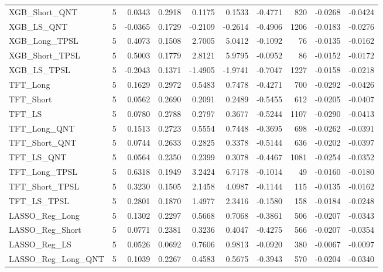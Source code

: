\begin{tabular}{llrrrrrrrr}
\cline{1-10}
XGB\_Short\_QNT & 5 & 0.0343 & 0.2918 & 0.1175 & 0.1533 & -0.4771 & 820 & -0.0268 & -0.0424 \\
\cline{1-10}
XGB\_LS\_QNT & 5 & -0.0365 & 0.1729 & -0.2109 & -0.2614 & -0.4906 & 1206 & -0.0183 & -0.0276 \\
\cline{1-10}
XGB\_Long\_TPSL & 5 & 0.4073 & 0.1508 & 2.7005 & 5.0412 & -0.1092 & 76 & -0.0135 & -0.0162 \\
\cline{1-10}
XGB\_Short\_TPSL & 5 & 0.5003 & 0.1779 & 2.8121 & 5.9795 & -0.0952 & 86 & -0.0152 & -0.0172 \\
\cline{1-10}
XGB\_LS\_TPSL & 5 & -0.2043 & 0.1371 & -1.4905 & -1.9741 & -0.7047 & 1227 & -0.0158 & -0.0218 \\
\cline{1-10}
TFT\_Long & 5 & 0.1629 & 0.2972 & 0.5483 & 0.7478 & -0.4271 & 700 & -0.0292 & -0.0426 \\
\cline{1-10}
TFT\_Short & 5 & 0.0562 & 0.2690 & 0.2091 & 0.2489 & -0.5455 & 612 & -0.0205 & -0.0407 \\
\cline{1-10}
TFT\_LS & 5 & 0.0780 & 0.2788 & 0.2797 & 0.3677 & -0.5244 & 1107 & -0.0290 & -0.0413 \\
\cline{1-10}
TFT\_Long\_QNT & 5 & 0.1513 & 0.2723 & 0.5554 & 0.7448 & -0.3695 & 698 & -0.0262 & -0.0391 \\
\cline{1-10}
TFT\_Short\_QNT & 5 & 0.0744 & 0.2633 & 0.2825 & 0.3378 & -0.5144 & 636 & -0.0202 & -0.0397 \\
\cline{1-10}
TFT\_LS\_QNT & 5 & 0.0564 & 0.2350 & 0.2399 & 0.3078 & -0.4467 & 1081 & -0.0254 & -0.0352 \\
\cline{1-10}
TFT\_Long\_TPSL & 5 & 0.6318 & 0.1949 & 3.2424 & 6.7178 & -0.1014 & 49 & -0.0160 & -0.0180 \\
\cline{1-10}
TFT\_Short\_TPSL & 5 & 0.3230 & 0.1505 & 2.1458 & 4.0987 & -0.1144 & 115 & -0.0135 & -0.0162 \\
\cline{1-10}
TFT\_LS\_TPSL & 5 & 0.2801 & 0.1870 & 1.4977 & 2.3416 & -0.1580 & 158 & -0.0184 & -0.0248 \\
\cline{1-10}
LASSO\_Reg\_Long & 5 & 0.1302 & 0.2297 & 0.5668 & 0.7068 & -0.3861 & 506 & -0.0207 & -0.0343 \\
\cline{1-10}
LASSO\_Reg\_Short & 5 & 0.0771 & 0.2381 & 0.3236 & 0.4047 & -0.4275 & 566 & -0.0207 & -0.0354 \\
\cline{1-10}
LASSO\_Reg\_LS & 5 & 0.0526 & 0.0692 & 0.7606 & 0.9813 & -0.0920 & 380 & -0.0067 & -0.0097 \\
\cline{1-10}
LASSO\_Reg\_Long\_QNT & 5 & 0.1039 & 0.2267 & 0.4583 & 0.5675 & -0.3943 & 570 & -0.0204 & -0.0340 \\

\end{tabular}

